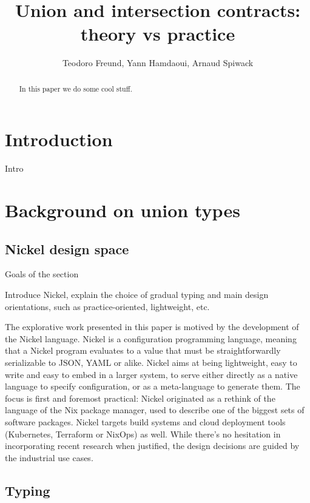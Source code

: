 \documentclass{article}
\title{Union and intersection contracts: theory vs practice}
\author{Teodoro Freund, Yann Hamdaoui, Arnaud Spiwack}
\begin{document}
\maketitle

\begin{abstract}
 In this paper we do some cool stuff.
\end{abstract}

\section*{Introduction}
Intro

\section{Background on union types}

\subsection{Nickel design space}

\color{red}Goals of the section

Introduce Nickel, explain the choice of gradual
typing and main design orientations, such as practice-oriented, lightweight,
etc.\vspace{0.5cm}\color{black}

The explorative work presented in this paper is motived by the development of
the Nickel language\cite{NickelRepo}. Nickel is a configuration programming
language, meaning that a Nickel program evaluates to a value that must be
straightforwardly serializable to JSON, YAML or alike. Nickel aims at being
lightweight, easy to write and easy to embed in a larger system, to serve either
directly as a native language to specify configuration, or as a meta-language to
generate them. The focus is first and foremost practical: Nickel originated as a
rethink of the language of the Nix package manager, used to describe one of the
biggest sets of software packages\cite{repology}.  Nickel targets build systems
and cloud deployment tools (Kubernetes, Terraform or NixOps) as well. While
there's no hesitation in incorporating recent research when justified, the
design decisions are guided by the industrial use cases.

\subsection{Typing}
\end{document}
